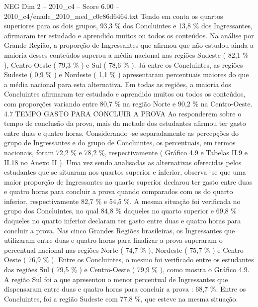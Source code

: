 \begin{textsample}{NEG Dim 2 – 2010\_c4 – Score 6.00 – 2010\_c4/enade\_2010\_med\_c0c86d6464.txt}
Tendo em conta os quartos superiores para os dois grupos, 93,3 \% dos Concluintes e 13,8 \% dos Ingressantes, afirmaram ter estudado e aprendido muitos ou todos os conteúdos.
Na análise por Grande Região, a proporção de Ingressantes que afirmou que não estudou ainda a maioria desses conteúdos superou a média nacional nas regiões Sudeste ( 82,1 \% ), Centro-Oeste ( 79,3 \% ) e Sul ( 78,6 \% ).
Já entre os Concluintes, as regiões Sudeste ( 0,9 \% ) e Nordeste ( 1,1 \% ) apresentaram percentuais maiores do que a média nacional para esta alternativa.
Em todas as regiões, a maioria dos Concluintes afirmaram ter estudado e aprendido muitos ou todos os conteúdos, com proporções variando entre 80,7 \% na região Norte e 90,2 \% na Centro-Oeste. 4.7 TEMPO GASTO PARA CONCLUIR A PROVA Ao responderem sobre o tempo de conclusão da prova, mais da metade dos estudantes afirmou ter gasto entre duas e quatro horas.
Considerando -se separadamente as percepções do grupo de Ingressantes e do grupo de Concluintes, os percentuais, em termos nacionais, foram 72,2 \% e 78,2 \%, respectivamente ( Gráfico 4.9 e Tabelas II.9 e II.18 no Anexo II ).
Uma vez sendo analisadas as alternativas oferecidas pelos estudantes que se situaram nos quartos superior e inferior, observa -se que uma maior proporção de Ingressantes no quarto superior declarou ter gasto entre duas e quatro horas para concluir a prova quando comparados com os do quarto inferior, respectivamente 82,7 \% e 54,5 \%.
A mesma situação foi verificada no grupo dos Concluintes, no qual 84,8 \% daqueles no quarto superior e 69,8 \% daqueles no quarto inferior declaram ter gasto entre duas e quatro horas para concluir a prova.
Nas cinco Grandes Regiões brasileiras, os Ingressantes que utilizaram entre duas e quatro horas para finalizar a prova superaram o percentual nacional nas regiões Norte ( 74,7 \% ), Nordeste ( 75,7 \% ) e Centro-Oeste ( 76,9 \% ).
Entre os Concluintes, o mesmo foi verificado entre os estudantes das regiões Sul ( 79,5 \% ) e Centro-Oeste ( 79,9 \% ), como mostra o Gráfico 4.9.
A região Sul foi a que apresentou o menor percentual de Ingressantes que dispensaram entre duas e quatro horas para concluir a prova : 68,7 \%.
Entre os Concluintes, foi a região Sudeste com 77,8 \%, que esteve na mesma situação.

\end{textsample}

